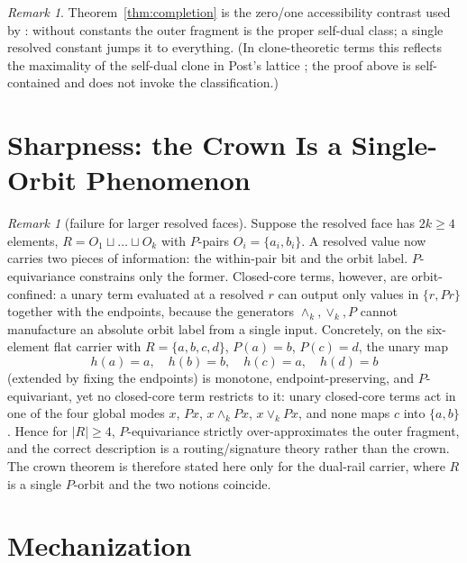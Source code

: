 \documentclass[11pt]{article}
\theoremstyle{remark}
\newtheorem{remarkc}[theorem]{Remark}
\newcommand{\meetk}{\ensuremath{\wedge_k}}
\newcommand{\joink}{\ensuremath{\vee_k}}
\begin{document}
\begin{remarkc}
Theorem~\ref{thm:completion} is the zero/one accessibility contrast used
by \cite[App.~A.5]{wcy2}: without constants the outer fragment is the
proper self-dual class; a single resolved constant jumps it to
everything. (In clone-theoretic terms this reflects the maximality of the
self-dual clone in Post's lattice \cite{post}; the proof above is
self-contained and does not invoke the classification.)
\end{remarkc}

\section{Sharpness: the Crown Is a Single-Orbit Phenomenon}
\label{sec:sharp}

\begin{remarkc}[failure for larger resolved faces]
Suppose the resolved face has $2k\ge 4$ elements,
$R=O_1\sqcup\dots\sqcup O_k$ with $P$-pairs $O_i=\{a_i,b_i\}$. A resolved
value now carries two pieces of information: the within-pair bit and the
orbit label. $P$-equivariance constrains only the former. Closed-core
terms, however, are orbit-confined: a unary term evaluated at a resolved
$r$ can output only values in $\{r,Pr\}$ together with the endpoints,
because the generators $\meetk,\joink,P$ cannot manufacture an absolute
orbit label from a single input. Concretely, on the six-element flat
carrier with $R=\{a,b,c,d\}$, $P(a)=b$, $P(c)=d$, the unary map
\[
h(a)=a,\quad h(b)=b,\quad h(c)=a,\quad h(d)=b
\]
(extended by fixing the endpoints) is monotone, endpoint-preserving, and
$P$-equivariant, yet no closed-core term restricts to it: unary
closed-core terms act in one of the four global modes $x$, $Px$,
$x\meetk Px$, $x\joink Px$, and none maps $c$ into $\{a,b\}$. Hence for
$|R|\ge 4$, $P$-equivariance strictly over-approximates the outer
fragment, and the correct description is a routing/signature theory
rather than the crown. The crown theorem is therefore stated here only
for the dual-rail carrier, where $R$ is a single $P$-orbit and the two
notions coincide.
\end{remarkc}

\section{Mechanization}\label{sec:mech}
\end{document}
